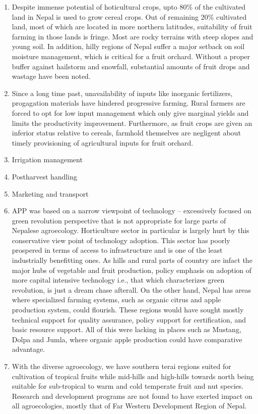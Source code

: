 \documentclass[
  openany]{book}
\begin{document}
\begin{enumerate}
\def\labelenumi{\arabic{enumi}.}
\item
  Despite immense potential of hoticultural crops, upto 80\% of the cultivated land in Nepal is used to grow cereal crops. Out of remaining 20\% cultivated land, most of which are located in more northern latitudes, suitability of fruit farming in those lands is fringe. Most are rocky terrains with steep slopes and young soil. In addition, hilly regions of Nepal suffer a major setback on soil moisture management, which is critical for a fruit orchard. Without a proper buffer against hailstorm and snowfall, substantial amounts of fruit drops and wastage have been noted.
\item
  Since a long time past, unavailability of inputs like inorganic fertilizers, progagation materials have hindered progressive farming. Rural farmers are forced to opt for low input management which only give marginal yields and limits the productivity improvement. Furthermore, as fruit crops are given an inferior status relative to cereals, farmhold themselves are negligent about timely provisioning of agricultural inputs for fruit orchard.
\item
  Irrigation management
\item
  Postharvest handling
\item
  Marketing and transport
\item
  APP was based on a narrow viewpoint of technology -- excessively focused on green revolution perspective that is not appropriate for large parts of Nepalese agroecology. Horticulture sector in particular is largely hurt by this conservative view point of technology adoption. This sector has poorly prospered in terms of access to infrastructure and is one of the least industrially benefitting ones. As hills and rural parts of country are infact the major hubs of vegetable and fruit production, policy emphasis on adoption of more capital intensive technology i.e., that which characterizes green revolution, is just a dream chase afterall. On the other hand, Nepal has areas where specialized farming systems, such as organic citrus and apple production system, could flourish. These regions would have sought mostly technical support for quality assurance, policy support for certification, and basic resource support. All of this were lacking in places such as Mustang, Dolpa and Jumla, where organic apple production could have comparative advantage.
\item
  With the diverse agroecology, we have southern terai regions suited for cultivation of tropical fruits while mid-hills and high-hills towards north being suitable for sub-tropical to warm and cold temperate fruit and nut species. Research and development programs are not found to have exerted impact on all agroecologies, mostly that of Far Western Development Region of Nepal.

\end{enumerate}
\end{document}

